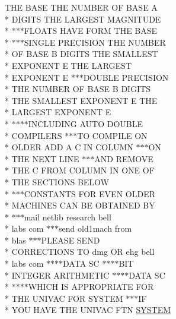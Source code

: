 \begin{DoxyCompactItemize}
\item 
T\+H\+E B\+A\+S\+E T\+H\+E N\+U\+M\+B\+E\+R O\+F B\+A\+S\+E A \\*
D\+I\+G\+I\+T\+S T\+H\+E L\+A\+R\+G\+E\+S\+T M\+A\+G\+N\+I\+T\+U\+D\+E \\*
$\ast$$\ast$$\ast$F\+L\+O\+A\+T\+S H\+A\+V\+E F\+O\+R\+M T\+H\+E B\+A\+S\+E \\*
$\ast$$\ast$$\ast$S\+I\+N\+G\+L\+E P\+R\+E\+C\+I\+S\+I\+O\+N T\+H\+E N\+U\+M\+B\+E\+R \\*
O\+F B\+A\+S\+E B D\+I\+G\+I\+T\+S T\+H\+E S\+M\+A\+L\+L\+E\+S\+T \\*
E\+X\+P\+O\+N\+E\+N\+T E T\+H\+E L\+A\+R\+G\+E\+S\+T \\*
E\+X\+P\+O\+N\+E\+N\+T E $\ast$$\ast$$\ast$D\+O\+U\+B\+L\+E P\+R\+E\+C\+I\+S\+I\+O\+N \\*
T\+H\+E N\+U\+M\+B\+E\+R O\+F B\+A\+S\+E B D\+I\+G\+I\+T\+S \\*
T\+H\+E S\+M\+A\+L\+L\+E\+S\+T E\+X\+P\+O\+N\+E\+N\+T E T\+H\+E \\*
L\+A\+R\+G\+E\+S\+T E\+X\+P\+O\+N\+E\+N\+T E \\*
$\ast$$\ast$$\ast$$\ast$I\+N\+C\+L\+U\+D\+I\+N\+G A\+U\+T\+O D\+O\+U\+B\+L\+E \\*
C\+O\+M\+P\+I\+L\+E\+R\+S $\ast$$\ast$$\ast$T\+O C\+O\+M\+P\+I\+L\+E O\+N \\*
O\+L\+D\+E\+R A\+D\+D A C I\+N C\+O\+L\+U\+M\+N $\ast$$\ast$$\ast$O\+N \\*
T\+H\+E N\+E\+X\+T L\+I\+N\+E $\ast$$\ast$$\ast$A\+N\+D R\+E\+M\+O\+V\+E \\*
T\+H\+E C F\+R\+O\+M C\+O\+L\+U\+M\+N I\+N O\+N\+E O\+F \\*
T\+H\+E S\+E\+C\+T\+I\+O\+N\+S B\+E\+L\+O\+W \\*
$\ast$$\ast$$\ast$C\+O\+N\+S\+T\+A\+N\+T\+S F\+O\+R E\+V\+E\+N O\+L\+D\+E\+R \\*
M\+A\+C\+H\+I\+N\+E\+S C\+A\+N B\+E O\+B\+T\+A\+I\+N\+E\+D B\+Y \\*
$\ast$$\ast$$\ast$mail netlib research bell \\*
labs com $\ast$$\ast$$\ast$send old1mach from \\*
blas $\ast$$\ast$$\ast$P\+L\+E\+A\+S\+E S\+E\+N\+D \\*
C\+O\+R\+R\+E\+C\+T\+I\+O\+N\+S T\+O dmg O\+R ehg bell \\*
labs com $\ast$$\ast$$\ast$$\ast$D\+A\+T\+A S\+C $\ast$$\ast$$\ast$$\ast$B\+I\+T \\*
I\+N\+T\+E\+G\+E\+R A\+R\+I\+T\+H\+M\+E\+T\+I\+C $\ast$$\ast$$\ast$$\ast$D\+A\+T\+A S\+C \\*
$\ast$$\ast$$\ast$$\ast$W\+H\+I\+C\+H I\+S A\+P\+P\+R\+O\+P\+R\+I\+A\+T\+E F\+O\+R \\*
T\+H\+E U\+N\+I\+V\+A\+C F\+O\+R S\+Y\+S\+T\+E\+M $\ast$$\ast$$\ast$I\+F \\*
Y\+O\+U H\+A\+V\+E T\+H\+E U\+N\+I\+V\+A\+C F\+T\+N \hyperlink{namespaceport_afa2500030514bcf24109353ab42bf64f}{S\+Y\+S\+T\+E\+M}
\end{DoxyCompactItemize}



